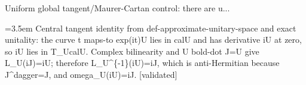 \documentclass{article}
\newcommand{\step}[1]{\par\noindent\hangindent=3.5em\hangafter=1%
  \makebox[3.5em][l]{\textbf{#1.}}}
\newcommand{\steptag}[1]{\hfill{\small\textsf{[#1]}}}
\begin{document}
\begin{proofbox}{Uniform global tangent/Maurer-Cartan control: there are u...}
\step{1.4.2} Central tangent identity from def-approximate-unitary-space and exact unitality: the curve t maps-to exp(it)U lies in calU and has derivative iU at zero, so iU lies in T\_UcalU. Complex bilinearity and U bold-dot J=U give L\_U(iJ)=iU; therefore L\_U\textasciicircum{}\{-1\}(iU)=iJ, which is anti-Hermitian because J\textasciicircum{}dagger=J, and omega\_U(iU)=iJ. \steptag{validated} \\[4pt]
\end{proofbox}
\end{document}
